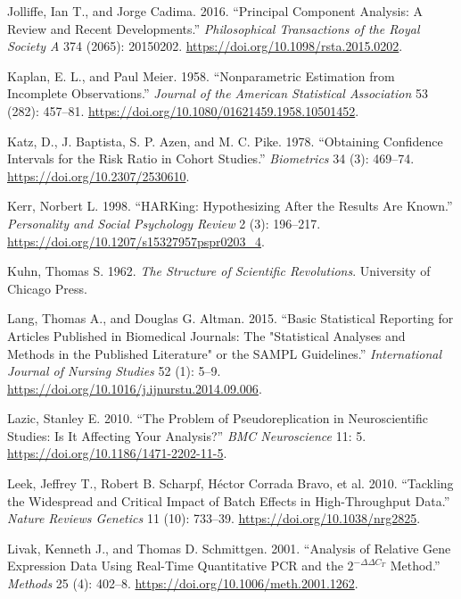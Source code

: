 \documentclass[
]{book}
\newlength{\cslhangindent}
\newenvironment{CSLReferences}[2] %
 {\begin{list}{}{%
  \setlength{\itemindent}{0pt}
  \setlength{\leftmargin}{0pt}
  \setlength{\parsep}{0pt}
  \ifodd #1
   \setlength{\leftmargin}{\cslhangindent}
   \setlength{\itemindent}{-1\cslhangindent}
  \fi
  \setlength{\itemsep}{#2\baselineskip}}}
 {\end{list}}
\begin{document}
\begin{CSLReferences}{1}{1}
Jolliffe, Ian T., and Jorge Cadima. 2016. {``Principal Component Analysis: A Review and Recent Developments.''} \emph{Philosophical Transactions of the Royal Society A} 374 (2065): 20150202. \url{https://doi.org/10.1098/rsta.2015.0202}.

Kaplan, E. L., and Paul Meier. 1958. {``Nonparametric Estimation from Incomplete Observations.''} \emph{Journal of the American Statistical Association} 53 (282): 457--81. \url{https://doi.org/10.1080/01621459.1958.10501452}.

Katz, D., J. Baptista, S. P. Azen, and M. C. Pike. 1978. {``Obtaining Confidence Intervals for the Risk Ratio in Cohort Studies.''} \emph{Biometrics} 34 (3): 469--74. \url{https://doi.org/10.2307/2530610}.

Kerr, Norbert L. 1998. {``{HARKing}: Hypothesizing After the Results Are Known.''} \emph{Personality and Social Psychology Review} 2 (3): 196--217. \url{https://doi.org/10.1207/s15327957pspr0203_4}.

Kuhn, Thomas S. 1962. \emph{The Structure of Scientific Revolutions}. University of Chicago Press.

Lang, Thomas A., and Douglas G. Altman. 2015. {``Basic Statistical Reporting for Articles Published in Biomedical Journals: The "Statistical Analyses and Methods in the Published Literature" or the {SAMPL} Guidelines.''} \emph{International Journal of Nursing Studies} 52 (1): 5--9. \url{https://doi.org/10.1016/j.ijnurstu.2014.09.006}.

Lazic, Stanley E. 2010. {``The Problem of Pseudoreplication in Neuroscientific Studies: Is It Affecting Your Analysis?''} \emph{BMC Neuroscience} 11: 5. \url{https://doi.org/10.1186/1471-2202-11-5}.

{Leek, Jeffrey T., Robert B. Scharpf, Héctor Corrada Bravo, et al.} 2010. {``Tackling the Widespread and Critical Impact of Batch Effects in High-Throughput Data.''} \emph{Nature Reviews Genetics} 11 (10): 733--39. \url{https://doi.org/10.1038/nrg2825}.

Livak, Kenneth J., and Thomas D. Schmittgen. 2001. {``Analysis of Relative Gene Expression Data Using Real-Time Quantitative {PCR} and the \(2^{-\Delta\Delta C_T}\) Method.''} \emph{Methods} 25 (4): 402--8. \url{https://doi.org/10.1006/meth.2001.1262}.


\end{CSLReferences}
\end{document}
